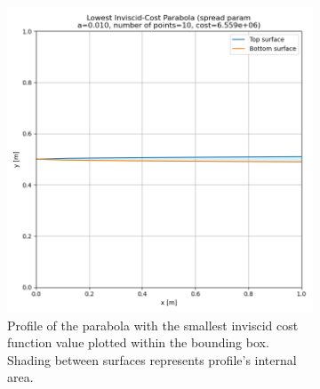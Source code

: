 \documentclass[11pt]{article}
\begin{document}
\begin{figure}[H]
\begin{subfigure}[b]{0.45\textwidth}
    \centering
    \includegraphics[width=\linewidth]{../results/inviscid/lowest_cost_parabola.png}
    \caption{Profile of the parabola with the smallest inviscid cost function value plotted within the bounding box. Shading between surfaces represents profile's internal area.}
    \label{fig:inv-parabola-b}
\end{subfigure}
\caption{}
\label{fig:inv-parabola}
\end{figure}
\end{document}
